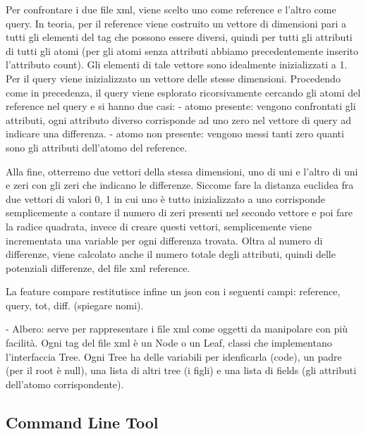  Per confrontare i due file xml, viene scelto uno come reference e l'altro come query. In teoria, per il reference viene costruito un vettore di dimensioni pari a tutti gli elementi del tag che possono essere diversi, quindi per tutti gli attributi di tutti gli atomi (per gli atomi senza attributi abbiamo precedentemente inserito l'attributo count). Gli elementi di tale vettore sono idealmente inizializzati a 1. Per il query viene inizializzato un vettore delle stesse dimensioni. Procedendo come in precedenza, il query viene esplorato ricorsivamente cercando gli atomi del reference nel query e si hanno due casi:
 - atomo presente: vengono confrontati gli attributi, ogni attributo diverso corrisponde ad uno zero nel vettore di query ad indicare una differenza.
 - atomo non presente: vengono messi tanti zero quanti sono gli attributi dell'atomo del reference.

 Alla fine, otterremo due vettori della stessa dimensioni, uno di uni e l'altro di uni e zeri con gli zeri che indicano le differenze.
 Siccome fare la distanza euclidea fra due vettori di valori {0, 1} in cui uno è tutto inizializzato a uno corrisponde semplicemente a contare il numero di zeri presenti nel secondo vettore e poi fare la radice quadrata, invece di creare questi vettori, semplicemente viene incrementata una variable per ogni differenza trovata.
 Oltra al numero di differenze, viene calcolato anche il numero totale degli attributi, quindi delle potenziali differenze, del file xml reference.

 La feature compare restitutisce infine un json con i seguenti campi: reference, query, tot, diff. (spiegare nomi).


- Albero:
 serve per rappresentare i file xml come oggetti da manipolare con più facilità. Ogni tag del file xml è un Node o un Leaf, classi che implementano l'interfaccia Tree. Ogni Tree ha delle variabili per idenficarla (code), un padre (per il root è null), una lista di altri tree (i figli) e una lista di fields (gli attributi dell'atomo corrispondente).

\subsection{Command Line Tool}

